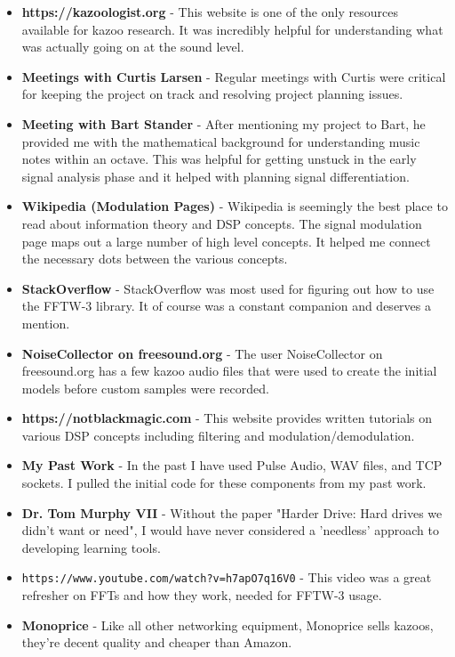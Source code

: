 \documentclass[]{article}
\begin{document}
\begin{itemize}
  \item \textbf{https://kazoologist.org} - This website is one of the only resources available for kazoo research. It was incredibly helpful for understanding what was actually going on at the sound level.

  \item \textbf{Meetings with Curtis Larsen} - Regular meetings with Curtis were critical for keeping the project on track and resolving project planning issues.

  \item \textbf{Meeting with Bart Stander} - After mentioning my project to Bart, he provided me with the mathematical background for understanding music notes within an octave. This was helpful for getting unstuck in the early signal analysis phase and it helped with planning signal differentiation.

  \item \textbf{Wikipedia (Modulation Pages)} - Wikipedia is seemingly the best place to read about information theory and DSP concepts. The signal modulation page maps out a large number of high level concepts. It helped me connect the necessary dots between the various concepts.

  \item \textbf{StackOverflow} - StackOverflow was most used for figuring out how to use the FFTW-3 library. It of course was a constant companion and deserves a mention.

  \item \textbf{NoiseCollector on freesound.org} - The user NoiseCollector on freesound.org has a few kazoo audio files that were used to create the initial models before custom samples were recorded.

  \item \textbf{https://notblackmagic.com} - This website provides written tutorials on various DSP concepts including filtering and modulation/demodulation.

  \item \textbf{My Past Work} - In the past I have used Pulse Audio, WAV files, and TCP sockets. I pulled the initial code for these components from my past work.
  
  \item \textbf{Dr. Tom Murphy VII} - Without the paper "Harder Drive: Hard drives we didn't want or need", I would have never considered a 'needless' approach to developing learning tools.

  \item \texttt{https://www.youtube.com/watch?v=h7apO7q16V0} - This video was a great refresher on FFTs and how they work, needed for FFTW-3 usage.

  \item \textbf{Monoprice} - Like all other networking equipment, Monoprice sells kazoos, they're decent quality and cheaper than Amazon.

\end{itemize}
\end{document}
